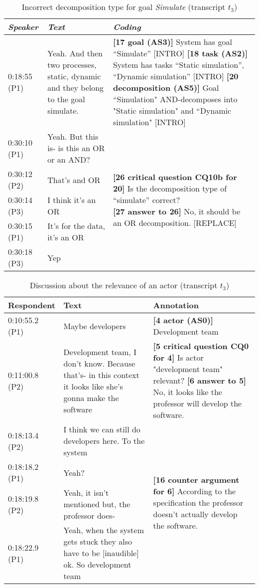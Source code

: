 \begin{table}[!htbp]
\begin{tabular}{|p{17mm}|p{43mm}|p{90mm}|}
\hline
\textit{Speaker} & \textit{Text} & \textit{Coding}\\
\hline
0:18:55 (P1) &Yeah. And then two processes, static, dynamic and they belong to the goal simulate. & \textbf{[17 goal (AS3)]} System has goal ``Simulate'' \textsf{[INTRO]}\newline
\textbf{[18 task (AS2)]} System has tasks ``Static simulation'', ``Dynamic simulation'' \textsf{[INTRO]}\newline  
\textbf{[20 decomposition (AS5)]} Goal ``Simulation" AND-decomposes into "Static simulation" and ``Dynamic simulation" \textsf{[INTRO]}\\
\hline
0:30:10 (P1) & 	Yeah. But this is- is this an OR or an AND? & \multirow{5}{90mm}{\textbf{[26 critical question CQ10b for 20]} Is the decomposition type of ``simulate'' correct?\newline
\textbf{[27 answer to 26]} No, it should be an OR decomposition. \textsf{[REPLACE]}}\\
\cline{1-2}
0:30:12 (P2) & That's and OR &\\
\cline{1-2}
0:30:14 (P3) & I think it's an OR &\\
\cline{1-2}
0:30:15 (P1) & It's for the data, it's an OR &\\
\cline{1-2}
0:30:18 (P3) & Yep &\\
\hline	
\end{tabular}
\caption{Incorrect decomposition type for goal \emph{Simulate} (transcript $t_3$)}
\label{table:transcript:decomposition}
\end{table}

\begin{table}[!htbp]
\centering
\begin{tabular}{|p{20mm}|p{70mm}|p{60mm}|}
\hline
Respondent & Text & Annotation\\
\hline
0:10:55.2 (P1) & Maybe developers &\textbf{[4 actor (AS0)]} Development team\\
\hline
0:11:00.8 (P2) & Development team, I don't know. Because that's- in this context it looks like she's gonna make the software & \textbf{[5 critical question CQ0 for 4]} Is actor "development team" relevant?\newline
\textbf{[6 answer to 5]} No, it looks like the professor will develop the software.\\
\hline
0:18:13.4 (P2) & I think we can still do developers here. To the system & \multirow{4}{60mm}{\textbf{[16 counter argument for 6]} According to the specification the professor doesn't actually develop the software.}\\
\cline{1-2}
0:18:18.2 (P1)  & Yeah?&\\
\cline{1-2}
0:18:19.8 (P2) & Yeah, it isn't mentioned but, the professor does-&\\
\cline{1-2}
0:18:22.9 (P1) & Yeah, when the system gets stuck they also have to be [inaudible] ok. So development team&\\	
\hline
\end{tabular}
\caption{Discussion about the relevance of an actor (transcript $t_3$)}
\label{table:transcript:irrelevant-actor}
\end{table}

